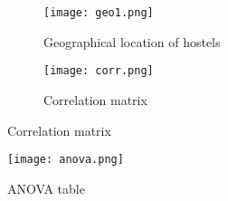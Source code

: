 \appendix

\pagestyle{plain}

\begin{figure}[h!]
	\centering	
	\begin{subfigure}{0.49\linewidth}
		\centering
		\texttt{[image: geo1.png]}
		\caption{Geographical location of hostels}
		\label{fig:geo1}
	\end{subfigure}
	\hfill
	\begin{subfigure}{0.49\linewidth}
		\centering
		\texttt{[image: corr.png]}
		\caption{Correlation matrix}
		\label{fig:corr}
	\end{subfigure}
\end{figure}


\begin{figure}[h!]
	\centering
	\texttt{[image: anova.png]}
	\caption{ANOVA table}
	\label{fig:anova}
\end{figure}

\newpage

